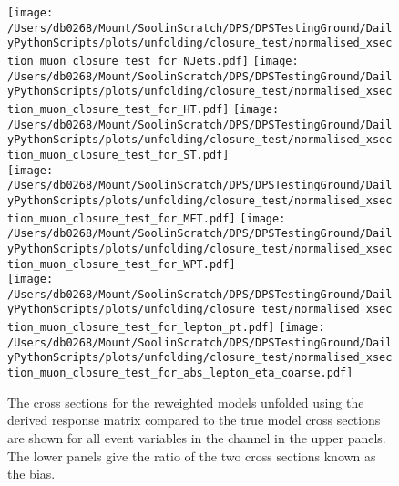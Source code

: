 \begin{figure*}[htpb]
	\centering
	\texttt{[image: /Users/db0268/Mount/SoolinScratch/DPS/DPSTestingGround/DailyPythonScripts/plots/unfolding/closure\_test/normalised\_xsection\_muon\_closure\_test\_for\_NJets.pdf]}
	\texttt{[image: /Users/db0268/Mount/SoolinScratch/DPS/DPSTestingGround/DailyPythonScripts/plots/unfolding/closure\_test/normalised\_xsection\_muon\_closure\_test\_for\_HT.pdf]}
	\texttt{[image: /Users/db0268/Mount/SoolinScratch/DPS/DPSTestingGround/DailyPythonScripts/plots/unfolding/closure\_test/normalised\_xsection\_muon\_closure\_test\_for\_ST.pdf]} \\
	\texttt{[image: /Users/db0268/Mount/SoolinScratch/DPS/DPSTestingGround/DailyPythonScripts/plots/unfolding/closure\_test/normalised\_xsection\_muon\_closure\_test\_for\_MET.pdf]}
	\texttt{[image: /Users/db0268/Mount/SoolinScratch/DPS/DPSTestingGround/DailyPythonScripts/plots/unfolding/closure\_test/normalised\_xsection\_muon\_closure\_test\_for\_WPT.pdf]} \\
	\texttt{[image: /Users/db0268/Mount/SoolinScratch/DPS/DPSTestingGround/DailyPythonScripts/plots/unfolding/closure\_test/normalised\_xsection\_muon\_closure\_test\_for\_lepton\_pt.pdf]}
	\texttt{[image: /Users/db0268/Mount/SoolinScratch/DPS/DPSTestingGround/DailyPythonScripts/plots/unfolding/closure\_test/normalised\_xsection\_muon\_closure\_test\_for\_abs\_lepton\_eta\_coarse.pdf]} \\
	\caption[The cross sections for the reweighted models unfolded using the \powhegpythia{} derived response matrix compared to the true model cross sections are shown for all event variables in the \muJets{} channel in the upper panels. The lower panels give the ratio of the two cross sections known as the bias.]{The cross sections for the reweighted models unfolded using the \powhegpythia{} derived response matrix compared to the true model cross sections are shown for all event variables in the \muJets{} channel in the upper panels. The lower panels give the ratio of the two cross sections known as the bias.}
	\label{fig:ClosureBiasmu1}
\end{figure*}

